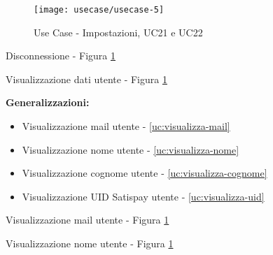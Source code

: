 
\begin{figure}[!h] 
    \centering 
    \texttt{[image: usecase/usecase-5]} 
    \caption{Use Case - Impostazioni, UC21 e UC22}
    \label{fig:uc-impostazioni}
\end{figure}

\begin{usecase}{20}{Disconnessione} - Figura \ref{fig:uc-impostazioni}
    \label{uc:disconnessione-utente}
\end{usecase}

\begin{usecase}{21}{Visualizzazione dati utente} - Figura \ref{fig:uc-impostazioni}
    \label{uc:visualizza-dati}
\end{usecase}

\noindent \textbf{Generalizzazioni:}
\begin{itemize}
    \item Visualizzazione mail utente - \ref{uc:visualizza-mail}
    \item Visualizzazione nome utente - \ref{uc:visualizza-nome}
    \item Visualizzazione cognome utente - \ref{uc:visualizza-cognome}
    \item Visualizzazione UID Satispay utente - \ref{uc:visualizza-uid}
\end{itemize}

\begin{usecase}{21.1}{Visualizzazione mail utente} - Figura \ref{fig:uc-impostazioni}
    \label{uc:visualizza-mail}
\end{usecase}

\begin{usecase}{21.2}{Visualizzazione nome utente} - Figura \ref{fig:uc-impostazioni}
    \label{uc:visualizza-nome}
\end{usecase}

